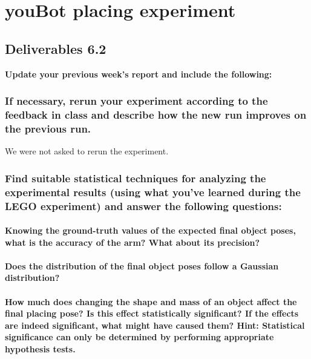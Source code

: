 \chapter{youBot placing experiment}
\section{Deliverables 6.2}
\textbf{Update your previous week’s report and include the following:}

\subsection{If necessary, rerun your experiment according to the feedback in class and describe how the new run improves on the previous run.}
We were not asked to rerun the experiment.

\subsection{Find suitable statistical techniques for analyzing the experimental results (using what you’ve learned during the LEGO experiment) and answer the following questions:}
\subsubsection{Knowing the ground-truth values of the expected final object poses, what is the accuracy of the arm? What about its precision?}

\subsubsection{Does the distribution of the final object poses follow a Gaussian distribution?}

\subsubsection{How much does changing the shape and mass of an object affect the final placing pose? Is this effect statistically significant? If the effects are indeed significant, what might have caused them? Hint: Statistical significance can only be determined by performing appropriate hypothesis tests.}


